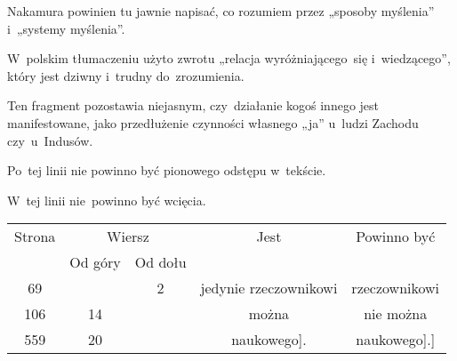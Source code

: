\documentclass[a4paper,11pt]{article}
\numberwithin{equation}{section}
\begin{document}
\noindent
{} Nakamura powinien tu jawnie napisać, co rozumiem przez
„sposoby myślenia” i~„systemy myślenia”.

\VerSpaceFour





\noindent
{} W~polskim tłumaczeniu użyto zwrotu „relacja
wyróżniającego~się i~wiedzącego”, który jest dziwny i~trudny
do~zrozumienia.

\VerSpaceFour





\noindent
{} Ten fragment pozostawia niejasnym,
czy~działanie kogoś innego jest manifestowane, jako przedłużenie
czynności własnego „ja” u~ludzi Zachodu czy~u~Indusów.

\VerSpaceFour





\noindent
{} Po~tej linii nie powinno być pionowego odstępu
w~tekście.

\VerSpaceFour





\noindent
{} W~tej linii nie~powinno być wcięcia.





\newpage



\begin{center}

  \begin{tabular}{|c|c|c|c|c|}
    \hline
    Strona & \multicolumn{2}{c|}{Wiersz} & Jest
                              & Powinno być \\ \cline{2-3}
    & Od góry & Od dołu & & \\
    \hline
    69  & &  2 & jedynie rzeczownikowi & rzeczownikowi \\
    106 & 14 & & można & nie można \\
    559 & 20 & & naukowego]. & naukowego].] \\
    \hline
  \end{tabular}

\end{center}
\end{document}
